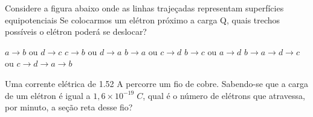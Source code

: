 \documentclass[12pt, addpoints]{exam}
\begin{document}
    \begin{questions}
\begin{multicols*}{2}
\question Considere a figura abaixo onde as linhas trajeçadas representam superfícies equipotenciais Se colocarmos um elétron próximo a carga Q, quais trechos possíveis o elétron poderá se deslocar?
        
        \begin{center}
            \begin{minipage}[c]{0.5\linewidth}
            \end{minipage}
        \end{center}
        
        

\begin{choices}
\choice $a\rightarrow b$ ou $d\rightarrow c$ 
\choice $c\rightarrow b$ ou $d\rightarrow a$ 
\choice $b\rightarrow a$ ou $c\rightarrow d$ 
\choice $b\rightarrow c$ ou $a\rightarrow d$ 
\choice $b\rightarrow a\rightarrow d\rightarrow c$ ou $c\rightarrow d\rightarrow a\rightarrow b$ 
\end{choices}
\question Uma corrente elétrica de    1.52 A percorre um ﬁo de cobre. Sabendo-se que a carga de um elétron é igual a $1,6\times 10^{-19}\;C$, qual é o número de elétrons que atravessa, por minuto, a seção reta desse ﬁo?


\end{multicols*}
\end{questions}
\end{document}
